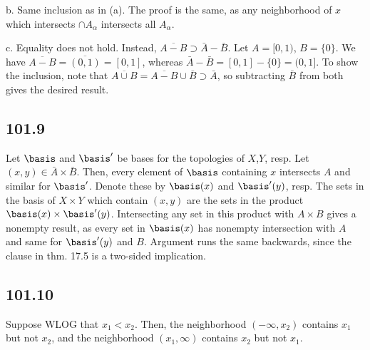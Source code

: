 \documentclass{article}
\begin{document}
b. Same inclusion as in (a). The proof is the same, as any neighborhood of $x$ which intersects $\cap A_\alpha$ intersects all $A_\alpha$.

c. Equality does not hold. Instead, $\overline{A-B}\supset\bar{A}-\bar{B}$. Let $A=[0,1)$, $B=\{0\}$. We have $\overline{A-B}=\overline{(0,1)}=[0,1]$, whereas $\bar{A}-\bar{B}=[0,1]-\{0\}=(0,1]$. To show the inclusion, note that $\overline{A\cup B}=\overline{A-B}\cup\bar{B}\supset\bar{A}$, so subtracting $\bar{B}$ from both gives the desired result.
\subsection*{101.9}
Let $\basis$ and $\basis'$ be bases for the topologies of $X$,$Y$, resp. Let $(x,y)\in\bar{A}\times\bar{B}$. Then, every element of $\basis$ containing $x$ intersects $A$ and similar for $\basis'$. Denote these by $\basis(x)$ and $\basis'(y)$, resp. The sets in the basis of $X\times Y$ which contain $(x,y)$ are the sets in the product $\basis(x)\times\basis'(y)$. Intersecting any set in this product with $A\times B$ gives a nonempty result, as every set in $\basis(x)$ has nonempty intersection with $A$ and same for $\basis'(y)$ and $B$. Argument runs the same backwards, since the clause in thm. 17.5 is a two-sided implication.
\subsection*{101.10}
Suppose WLOG that $x_1<x_2$. Then, the neighborhood $(-\infty,x_2)$ contains $x_1$ but not $x_2$, and the neighborhood $(x_1,\infty)$ contains $x_2$ but not $x_1$.
\end{document}
